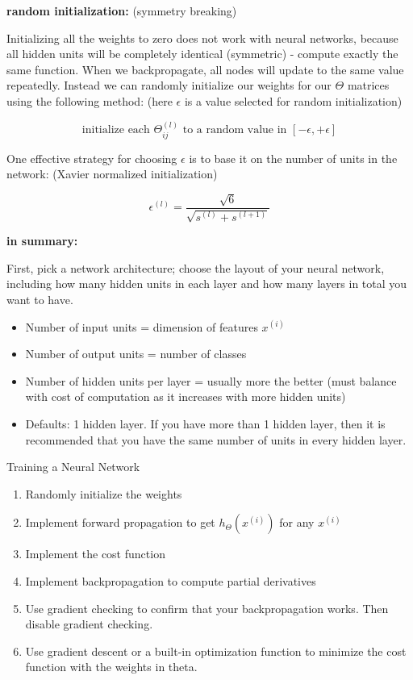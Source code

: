 \documentclass{article}
\begin{document}
\textbf{random initialization:} (symmetry breaking)

Initializing all the weights to zero does not work with neural networks, because all hidden units will be completely identical (symmetric) - compute exactly the same function. When we backpropagate, all nodes will update to the same value repeatedly. Instead we can randomly initialize our weights for our \(\Theta\) matrices using the following method: (here \(\epsilon\) is a value selected for random initialization)

\[\text{initialize each } \Theta_{ij}^{(l)} \text{ to a random value in } [-\epsilon, +\epsilon]\]

One effective strategy for choosing \(\epsilon\) is to base it on the number of units in the network: (Xavier normalized initialization)

\[\epsilon^{(l)} = \frac{\sqrt{6}}{\sqrt{s^{(l)} + s^{(l + 1)}}}\]

\textbf{in summary:}

First, pick a network architecture; choose the layout of your neural network, including how many hidden units in each layer and how many layers in total you want to have.

\begin{itemize}
  \item Number of input units = dimension of features \(x^{(i)}\)
  \item Number of output units = number of classes
  \item Number of hidden units per layer = usually more the better (must balance with cost of computation as it increases with more hidden units)
  \item Defaults: 1 hidden layer. If you have more than 1 hidden layer, then it is recommended that you have the same number of units in every hidden layer.
\end{itemize}

Training a Neural Network

\begin{enumerate}
  \item Randomly initialize the weights
  \item Implement forward propagation to get \(h_\Theta(x^{(i)})\) for any \(x^{(i)}\)
  \item Implement the cost function
  \item Implement backpropagation to compute partial derivatives
  \item Use gradient checking to confirm that your backpropagation works. Then disable gradient checking.
  \item Use gradient descent or a built-in optimization function to minimize the cost function with the weights in theta.
\end{enumerate}
\end{document}
